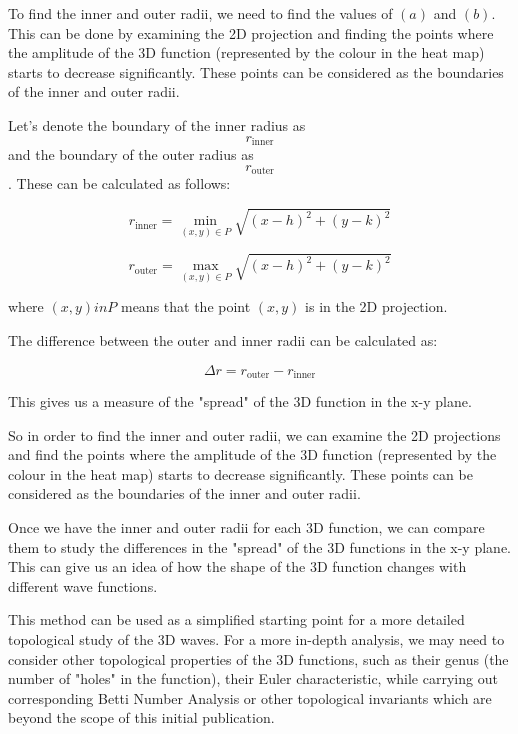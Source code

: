 To find the inner and outer radii, we need to find the values of $(a)$ and $(b)$. This can be done by examining the 2D projection and finding the points where the amplitude of the 3D function (represented by the colour in the heat map) starts to decrease significantly. These points can be considered as the boundaries of the inner and outer radii.

Let's denote the boundary of the inner radius as \begin{equation}
r_{\text{inner}}
\end{equation} and the boundary of the outer radius as \begin{equation}
r_{\text{outer}}
\end{equation}. These can be calculated as follows:

\begin{equation}
r_{\text{inner}} = \min_{(x, y) \in P} \sqrt{(x-h)^2 + (y-k)^2}
\end{equation}

\begin{equation}
r_{\text{outer}} = \max_{(x, y) \in P} \sqrt{(x-h)^2 + (y-k)^2}
\end{equation}


where $(x, y) in P$ means that the point $(x, y)$ is in the 2D projection.

The difference between the outer and inner radii can be calculated as:


\begin{equation}
\Delta r = r_{\text{outer}} - r_{\text{inner}}
\end{equation}


This gives us a measure of the "spread" of the 3D function in the x-y plane.

So in order to find the inner and outer radii, we can examine the 2D projections and find the points where the amplitude of the 3D function (represented by the colour in the heat map) starts to decrease significantly. These points can be considered as the boundaries of the inner and outer radii.

Once we have the inner and outer radii for each 3D function, we can compare them to study the differences in the "spread" of the 3D functions in the x-y plane. This can give us an idea of how the shape of the 3D function changes with different wave functions.

This method can be used as a simplified starting point for a more detailed topological study of the 3D waves. For a more in-depth analysis, we may need to consider other topological properties of the 3D functions, such as their genus (the number of "holes" in the function), their Euler characteristic, while carrying out corresponding Betti Number Analysis or other topological invariants which are beyond the scope of this initial publication.


